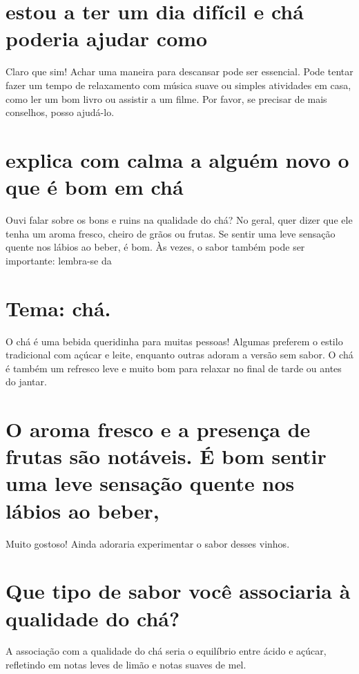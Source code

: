 \documentclass[11pt,a4paper]{article}
\begin{document}
\maketitle
\begin{abstract}Exploração do ollama a partir de sementes banais (nível 3). Teoria continua de fora.\end{abstract}
\section{estou a ter um dia difícil e chá poderia ajudar como}
Claro que sim! Achar uma maneira para descansar pode ser essencial. Pode tentar fazer um tempo de relaxamento com música suave ou simples atividades em casa, como ler um bom livro ou assistir a um filme. Por favor, se precisar de mais conselhos, posso ajudá-lo.

\section{explica com calma a alguém novo o que é bom em chá}
Ouvi falar sobre os bons e ruins na qualidade do chá? No geral, quer dizer que ele tenha um aroma fresco, cheiro de grãos ou frutas. Se sentir uma leve sensação quente nos lábios ao beber, é bom. Às vezes, o sabor também pode ser importante: lembra-se da

\section{Tema: chá.}
O chá é uma bebida queridinha para muitas pessoas! Algumas preferem o estilo tradicional com açúcar e leite, enquanto outras adoram a versão sem sabor. O chá é também um refresco leve e muito bom para relaxar no final de tarde ou antes do jantar.

\section{O aroma fresco e a presença de frutas são notáveis. É bom sentir uma leve sensação quente nos lábios ao beber,}
Muito gostoso! Ainda adoraria experimentar o sabor desses vinhos.

\section{Que tipo de sabor você associaria à qualidade do chá?}
A associação com a qualidade do chá seria o equilíbrio entre ácido e açúcar, refletindo em notas leves de limão e notas suaves de mel.
\end{document}
